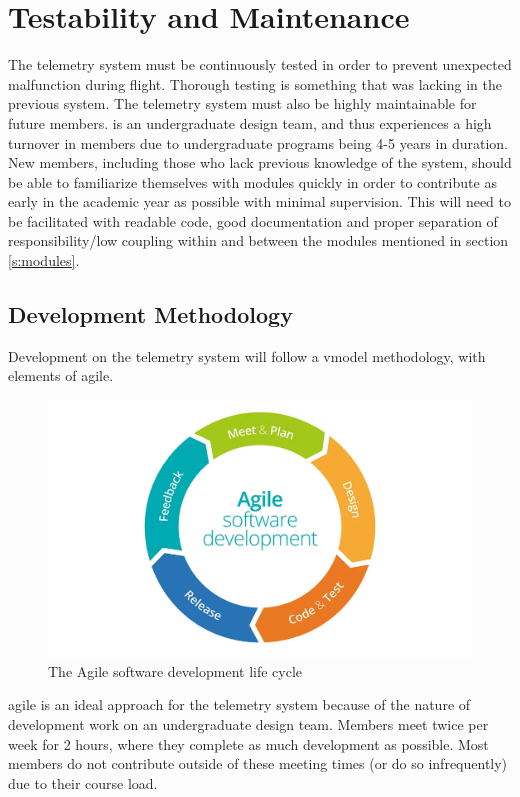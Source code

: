 \section{Testability and Maintenance}

The  telemetry system must be continuously tested in order to prevent unexpected malfunction
during flight. Thorough testing is something that was lacking in the previous system. The telemetry system must also be
highly maintainable for future members.  is an undergraduate design team, and thus experiences a
high turnover in members due to undergraduate programs being 4-5 years in duration. New members, including those who
lack previous knowledge of the system, should be able to familiarize themselves with modules quickly in order to
contribute as early in the academic year as possible with minimal supervision. This will need to be facilitated with
readable code, good documentation and proper separation of responsibility/low coupling within and between the modules
mentioned in section \ref{s:modules}.

\subsection{Development Methodology}

Development on the telemetry system will follow a \gls{vmodel} methodology, with elements of \gls{agile}.

\begin{figure}[H]
    \centerline{\includegraphics[width=0.7\linewidth]{assets/agile.png}}
    \caption{The Agile software development life cycle \cite{agile}}
\end{figure}

\Gls{agile} is an ideal approach for the  telemetry system because of the nature of development work
on an undergraduate design team. Members meet twice per week for 2 hours, where they complete as much development as
possible. Most members do not contribute outside of these meeting times (or do so infrequently) due to their course
load.


